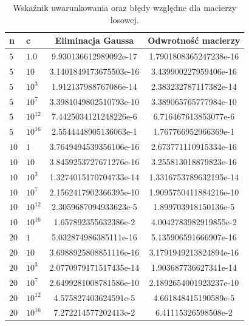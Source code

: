\documentclass{classrep}
\begin{document}
		
		\begin{table}[!h]
        	\centering
        	\footnotesize
			\begin{tabular}{l|l|S|S} \toprule
				{n} & {c} & {Eliminacja Gaussa} & {Odwrotność macierzy} \\ \midrule
				$5$ & $1.0$ & 9.930136612989092e-17 & 1.7901808365247238e-16 \\ 
	 			$5$ & $10$ & 3.1401849173675503e-16 & 3.439900227959406e-16 \\
	 			$5$ & $10^3$ & 1.912137988767086e-14 & 2.383232787117382e-14 \\
	 			$5$ & $10^7$ & 3.3981049802510793e-10 & 3.389065765777984e-10 \\
	 			$5$ & $10^{12}$ & 7.4425034121248226e-6 & 6.716467613853077e-6 \\ 
	 			$5$ & $10^{16}$ & 2.5544448905136063e-1 & 1.767766952966369e-1 \\
	 			$10$ & $1$ & 3.7649494539356106e-16 & 2.673771110915334e-16 \\
	 			$10$ & $10$ & 3.8459253727671276e-16 & 3.255813018879823e-16 \\ 
	 			$10$ & $10^3$  & 1.3274015170704733e-14 & 1.3316753789632195e-14 \\
	 			$10$ & $10^7$ & 2.1562417902366395e-10 & 1.9095750411884216e-10 \\
	 			$10$ & $10^{12}$ & 2.3059687094933623e-5 & 1.899703918150136e-5 \\ 
	 			$10$ & $10^{16}$ & 1.657892355632386e-2 & 4.0042783982919855e-2 \\
	 			$20$ & $1$ & 5.032874986385111e-16 & 5.135906591666907e-16 \\ 
	 			$20$ & $10$ & 3.6988925808851116e-16 & 3.1791949213824894e-16 \\
	 			$20$ & $10^3$ & 2.0770979171517435e-14 & 1.903687736627341e-14 \\
	 			$20$ & $10^7$ & 2.6499281008781586e-10 & 2.1892654001923237e-10 \\ 
	 			$20$ & $10^{12}$ & 4.575827403624591e-5 & 4.661848415190589e-5 \\
	 			$20$ & $10^{16}$  & 7.272214577202413e-2 & 6.41115326598508e-2 \\ \bottomrule
	 		\end{tabular}
	 		\caption{Wskaźnik uwarunkowania oraz błędy względne dla macierzy losowej.}
			\label{table:3}
		\end{table}	
\end{document}

